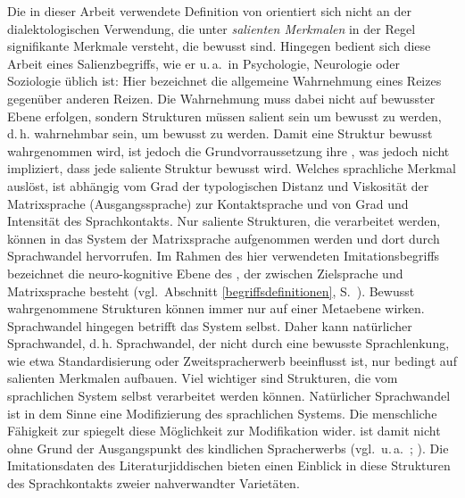 Die in dieser Arbeit verwendete Definition von  orientiert sich nicht an der dialektologischen Verwendung, die unter \textit{salienten Merkmalen} in der Regel signifikante Merkmale versteht, die bewusst sind. Hingegen bedient sich diese Arbeit eines Salienzbegriffs, wie er u.\,a.\, in Psychologie, Neurologie oder Soziologie üblich ist: Hier bezeichnet  die allgemeine Wahrnehmung eines Reizes gegenüber anderen Reizen. Die Wahrnehmung muss dabei nicht auf bewusster Ebene erfolgen, sondern Strukturen  müssen salient sein um bewusst zu werden, d.\,h. wahrnehmbar sein, um bewusst zu werden. Damit eine Struktur bewusst wahrgenommen wird, ist jedoch die Grundvorraussetzung ihre , was jedoch nicht impliziert, dass jede saliente Struktur bewusst wird. Welches sprachliche Merkmal  auslöst, ist abhängig vom Grad der typologischen Distanz und Viskosität der Matrixsprache (Ausgangssprache) zur Kontaktsprache und von Grad und Intensität des Sprachkontakts. Nur saliente Strukturen, die verarbeitet werden, können in das System der Matrixsprache aufgenommen werden und dort durch  Sprachwandel hervorrufen. Im Rahmen des hier verwendeten Imitationsbegriffs bezeichnet  die neuro-kognitive Ebene des , der zwischen Zielsprache und Matrixsprache besteht (vgl.\, Abschnitt \ref{begriffsdefinitionen}, S.\, \pageref{emulationsbegriff}). Bewusst wahrgenommene Strukturen können immer nur auf einer Metaebene wirken. Sprachwandel hingegen betrifft das System selbst. Daher kann natürlicher Sprachwandel, d.\,h. Sprachwandel, der nicht durch eine bewusste Sprachlenkung, wie etwa Standardisierung oder Zweitspracherwerb beeinflusst ist, nur bedingt auf salienten Merkmalen aufbauen. Viel wichtiger sind Strukturen, die vom sprachlichen System selbst verarbeitet werden können. Natürlicher Sprachwandel ist in dem Sinne eine Modifizierung des sprachlichen Systems. Die menschliche Fähigkeit zur  spiegelt diese Möglichkeit zur Modifikation wider.  ist damit nicht ohne Grund der Ausgangspunkt des kindlichen Spracherwerbs (vgl.\, u.\,a.\, \citealt{Uzgiris1981}; \citealt[291–294]{Tauten1997}). Die Imitationsdaten des Literaturjiddischen bieten einen Einblick in diese Strukturen des Sprachkontakts zweier nahverwandter Varietäten. 

